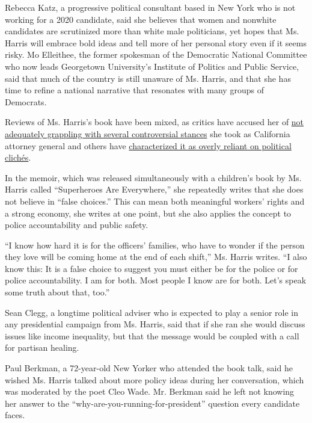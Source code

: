 Rebecca Katz, a progressive political consultant based in New York who
is not working for a 2020 candidate, said she believes that women and
nonwhite candidates are scrutinized more than white male politicians,
yet hopes that Ms. Harris will embrace bold ideas and tell more of her
personal story even if it seems risky. Mo Elleithee, the former
spokesman of the Democratic National Committee who now leads Georgetown
University's Institute of Politics and Public Service, said that much of
the country is still unaware of Ms. Harris, and that she has time to
refine a national narrative that resonates with many groups of
Democrats.

Reviews of Ms. Harris's book have been mixed, as critics have accused
her of
\href{https://reason.com/blog/2019/01/09/kamala-harris-new-book-tries-to-massage}{not
adequately grappling with several controversial stances} she took as
California attorney general and others have
\href{https://www.theatlantic.com/entertainment/archive/2019/01/kamala-harris-truths-we-hold-review/579430/}{characterized
it as overly reliant on political clichés}.

In the memoir, which was released simultaneously with a children's book
by Ms. Harris called ``Superheroes Are Everywhere,'' she repeatedly
writes that she does not believe in ``false choices.'' This can mean
both meaningful workers' rights and a strong economy, she writes at one
point, but she also applies the concept to police accountability and
public safety.

``I know how hard it is for the officers' families, who have to wonder
if the person they love will be coming home at the end of each shift,''
Ms. Harris writes. ``I also know this: It is a false choice to suggest
you must either be for the police or for police accountability. I am for
both. Most people I know are for both. Let's speak some truth about
that, too.''

Sean Clegg, a longtime political adviser who is expected to play a
senior role in any presidential campaign from Ms. Harris, said that if
she ran she would discuss issues like income inequality, but that the
message would be coupled with a call for partisan healing.

Paul Berkman, a 72-year-old New Yorker who attended the book talk, said
he wished Ms. Harris talked about more policy ideas during her
conversation, which was moderated by the poet Cleo Wade. Mr. Berkman
said he left not knowing her answer to the
``why-are-you-running-for-president'' question every candidate faces.

